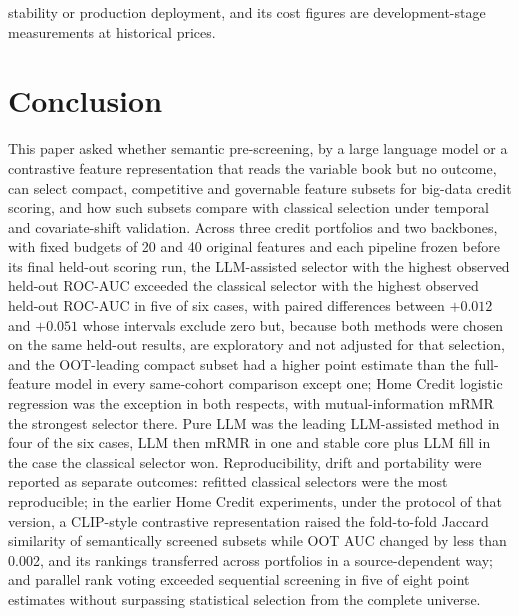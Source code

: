 \documentclass[final,5p,twocolumn]{elsarticle}
\begin{document}
stability or production deployment, and its cost figures are development-stage measurements at historical prices.


\section{Conclusion}
\label{sec:conclusion}

This paper asked whether semantic pre-screening, by a large language model or a contrastive feature representation that reads the variable book but no outcome, can select compact, competitive and governable feature subsets for big-data credit scoring, and how such subsets compare with classical selection under temporal and covariate-shift validation. Across three credit portfolios and two backbones, with fixed budgets of 20 and 40 original features and each pipeline frozen before its final held-out scoring run, the LLM-assisted selector with the highest observed held-out ROC-AUC exceeded the classical selector with the highest observed held-out ROC-AUC in five of six cases, with paired differences between $+0.012$ and $+0.051$ whose intervals exclude zero but, because both methods were chosen on the same held-out results, are exploratory and not adjusted for that selection, and the OOT-leading compact subset had a higher point estimate than the full-feature model in every same-cohort comparison except one; Home Credit logistic regression was the exception in both respects, with mutual-information mRMR the strongest selector there. Pure LLM was the leading LLM-assisted method in four of the six cases, LLM then mRMR in one and stable core plus LLM fill in the case the classical selector won. Reproducibility, drift and portability were reported as separate outcomes: refitted classical selectors were the most reproducible; in the earlier Home Credit experiments, under the protocol of that version, a CLIP-style contrastive representation raised the fold-to-fold Jaccard similarity of semantically screened subsets while OOT AUC changed by less than 0.002, and its rankings transferred across portfolios in a source-dependent way; and parallel rank voting exceeded sequential screening in five of eight point estimates without surpassing statistical selection from the complete universe.
\end{document}
